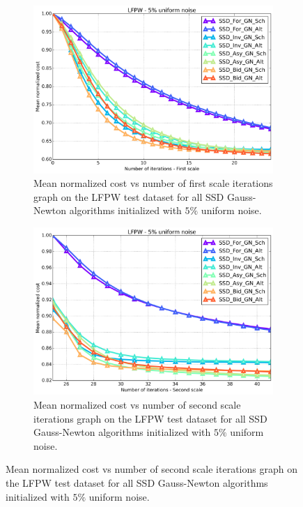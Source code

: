 \begin{figure}[h!]
	\par\bigskip
	\begin{subfigure}{0.48\textwidth}
	    \includegraphics[width=\textwidth]{experiments/algorithms/ssd_gn/mean_cost_vs_iters1_ssd_gn_5.png}
	    \caption{Mean normalized cost vs number of first scale iterations graph on the LFPW test dataset for all SSD Gauss-Newton algorithms initialized with $5\%$ uniform noise.}
	    \label{fig:mean_cost_vs_iters1_ssd_gn_5}
	\end{subfigure}
	\hfill
	\begin{subfigure}{0.48\textwidth}
	    \includegraphics[width=\textwidth]{experiments/algorithms/ssd_gn/mean_cost_vs_iters2_ssd_gn_5.png}
	    \caption{Mean normalized cost vs number of second scale iterations graph on the LFPW test dataset for all SSD Gauss-Newton algorithms initialized with $5\%$ uniform noise.}

\end{subfigure}
\end{figure}
